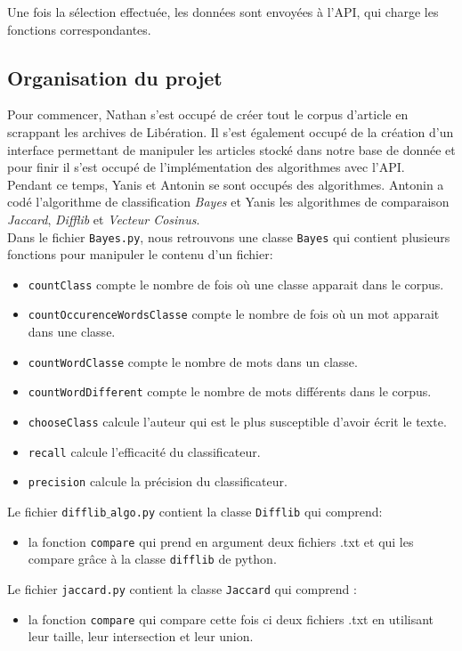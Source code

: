 \documentclass[french,12pt]{article}
\begin{document}
Une fois la sélection effectuée, les données sont envoyées à l'API, qui charge les fonctions correspondantes.

\subsection{Organisation du projet}

Pour commencer, Nathan s'est occupé de créer tout le corpus d'article en scrappant les archives de Libération. Il s'est également occupé de la création d'un interface permettant de manipuler les articles stocké dans notre base de donnée et pour finir il s'est occupé de l'implémentation des algorithmes avec l'API.\\

Pendant ce temps, Yanis et Antonin se sont occupés des algorithmes. Antonin a codé l'algorithme de classification \textit{Bayes} et Yanis les algorithmes de comparaison \textit{Jaccard}, \textit{Difflib} et  \textit{Vecteur Cosinus}.\\

Dans le fichier \texttt{Bayes.py}, nous retrouvons une classe \texttt{Bayes} qui contient plusieurs fonctions pour manipuler le contenu d'un fichier:
\begin{itemize}
	\item \texttt{countClass} compte le nombre de fois où une classe
	apparait dans le corpus.
	\item \texttt{countOccurenceWordsClasse} compte le nombre de fois où un
	mot apparait dans une classe.
	\item \texttt{countWordClasse} compte le nombre de mots dans un classe.
	\item \texttt{countWordDifferent} compte le nombre de mots différents
	dans le corpus.
	\item \texttt{chooseClass} calcule l'auteur qui est le plus susceptible
	d'avoir écrit le texte.
	\item \texttt{recall} calcule l'efficacité du classificateur.
	\item \texttt{precision} calcule la précision du classificateur.\\
\end{itemize}
Le fichier \texttt{difflib$\_$algo.py}  contient la classe \texttt{Difflib} qui comprend:
\begin{itemize}
\item la fonction \texttt{compare} qui prend en argument deux fichiers .txt et qui les compare grâce à la classe \texttt{difflib} de python.\\
\end{itemize}
Le fichier \texttt{jaccard.py} contient la classe \texttt{Jaccard} qui comprend :
\begin{itemize}
    \item la fonction \texttt{compare} qui compare cette fois ci deux fichiers .txt  en utilisant leur taille, leur intersection et leur union.\\
\end{itemize}
\end{document}
